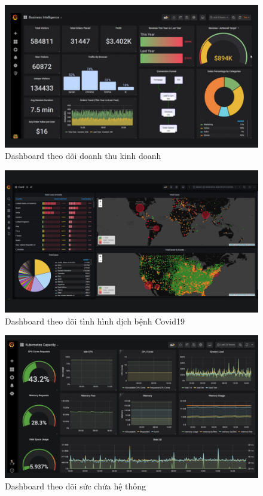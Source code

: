 \begin{figure}[H] %
    \centering %
    \includegraphics[width=1\textwidth]{figures/Grafana8_Revenue.jpg} 
    \caption{Dashboard theo dõi doanh thu kinh doanh} %
    \label{fig:fig_01}
\end{figure}
\begin{figure}[H] %
    \centering %
    \includegraphics[width=1\textwidth]{figures/Grafana8_Covid19.jpg} 
    \caption{Dashboard theo dõi tình hình dịch bệnh Covid19} %
    \label{fig:fig_01}
\end{figure}
\begin{figure}[H] %
    \centering %
    \includegraphics[width=1\textwidth]{figures/Grafana8_Kubernetes.jpg} 
    \caption{Dashboard theo dõi sức chứa hệ thống} %
    \label{fig:fig_01}
\end{figure}
